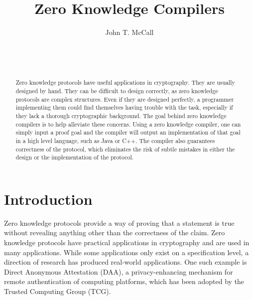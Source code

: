 \documentclass{sig-alternate}
\begin{document}

\title{Zero Knowledge Compilers}


\author{
\alignauthor
John T. McCall\\
	\\
	\\
	\\
}

\maketitle

\begin{abstract}
Zero knowledge protocols have useful applications in cryptography.
They are usually designed by hand. They can be difficult to
design correctly, as zero knowledge 
protocols are complex structures. Even if they are designed perfectly,
a programmer implementing them could find themselves having trouble
with the task, especially if they lack a thorough cryptographic background.
The goal behind zero knowledge compilers is to help alleviate these
concerns. Using a zero knowledge compiler, one can simply input a proof
goal and the compiler will output an implementation of that goal in a
high level language, such as Java or C++. The compiler also guarantees
correctness of the protocol, which eliminates the risk of subtle mistakes
in either the design or the implementation of the protocol.

\end{abstract}


\section{Introduction}
	Zero knowledge protocols provide a way of proving that a statement is true
	without revealing anything other than the correctness of the claim. Zero
	knowledge protocols have practical applications in cryptography and
	are used in many applications. While some applications only exist
	on a specification level, a direction of research has produced real-world
	applications. One such example is Direct Anonymous Attestation (DAA),
	a privacy-enhancing mechanism for remote authentication of computing
	platforms, which has been adopted by the Trusted Computing Group (TCG).
	
\end{document}
